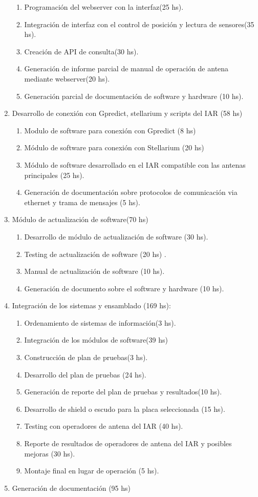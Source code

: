 \documentclass[11pt, %
codirector, %
]{charter}
\begin{document}
\begin{enumerate}
\begin{enumerate}
		\item Programación del webserver con la interfaz(25 hs). 
		\item Integración de interfaz con el control de posición y lectura de sensores(35 hs). 
		\item Creación de API de consulta(30 hs). 
		\item Generación de informe parcial de manual de operación de antena mediante webserver(20 hs). 
		\item Generación parcial de documentación de software y hardware (10 hs).  
	\end{enumerate}
\item Desarrollo de conexión con Gpredict, stellarium y scripts del IAR (58 hs) 
	\begin{enumerate}
		\item Modulo de software para conexión con Gpredict (8 hs)
		\item Módulo de software para conexión con Stellarium (20 hs) 
		\item Módulo de software desarrollado en el IAR compatible con las antenas principales (25 hs). 
		\item Generación de documentación sobre protocolos de comunicación via ethernet y trama de mensajes (5 hs). 
	\end{enumerate}
\item Módulo de actualización de software(70 hs) 
	\begin{enumerate}
		\item Desarrollo de módulo de actualización de software (30 hs). 
		\item Testing de actualización de software (20 hs) . 
		\item Manual de actualización de software (10 hs).
		\item Generación de documento sobre el software y hardware (10 hs).
		  
	\end{enumerate}	
\item Integración de los sistemas y ensamblado (169 hs): 
	\begin{enumerate}
	\item Ordenamiento de sistemas de información(3 hs). 
	\item Integración de los módulos de software(39 hs)
	\item Construcción de plan de pruebas(3 hs). 
	\item Desarrollo del plan de pruebas (24 hs). 
	\item Generación de reporte del plan de pruebas y resultados(10 hs).  
	\item Desarrollo de shield o escudo para la placa seleccionada (15 hs). 
	\item Testing con operadores de antena del IAR (40 hs). 
	\item Reporte de resultados de operadores de antena del IAR y posibles mejoras (30 hs).
	\item Montaje final en lugar de operación (5 hs).
	\end{enumerate}	
\item Generación de documentación (95 hs)
	

\end{enumerate}
\end{document}
